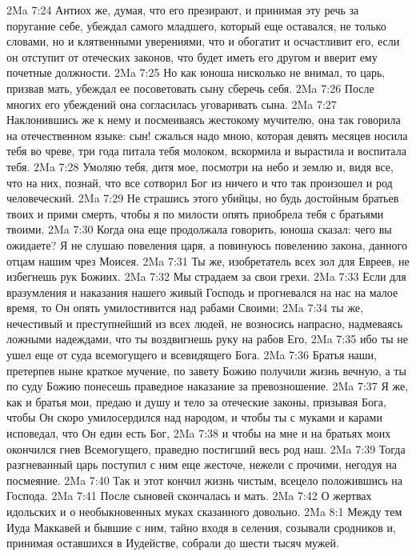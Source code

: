 \vs 2Ma 7:24 Антиох же, думая, что его презирают, и принимая эту речь за поругание себе, убеждал самого младшего, который еще оставался, не только словами, но и клятвенными уверениями, что и обогатит и осчастливит его, если он отступит от отеческих законов, что будет иметь его другом и вверит ему почетные должности.
\vs 2Ma 7:25 Но как юноша нисколько не внимал, то царь, призвав мать, убеждал ее посоветовать сыну сберечь себя.
\vs 2Ma 7:26 После многих его убеждений она согласилась уговаривать сына.
\vs 2Ma 7:27 Наклонившись же к нему и посмеиваясь жестокому мучителю, она так говорила на отечественном языке: сын! сжалься надо мною, которая девять месяцев носила тебя во чреве, три года питала тебя молоком, вскормила и вырастила и воспитала тебя.
\vs 2Ma 7:28 Умоляю тебя, дитя мое, посмотри на небо и землю и, видя все, что на них, познай, что все сотворил Бог из ничего и что так произошел и род человеческий.
\vs 2Ma 7:29 Не страшись этого убийцы, но будь достойным братьев твоих и прими смерть, чтобы я по милости  опять приобрела тебя с братьями твоими.
\rsbpar\vs 2Ma 7:30 Когда она еще продолжала говорить, юноша сказал: чего вы ожидаете? Я не слушаю повеления царя, а повинуюсь повелению закона, данного отцам нашим чрез Моисея.
\vs 2Ma 7:31 Ты же, изобретатель всех зол для Евреев, не избегнешь рук Божиих.
\vs 2Ma 7:32 Мы страдаем за свои грехи.
\vs 2Ma 7:33 Если для вразумления и наказания нашего живый Господь и прогневался на нас на малое время, то Он опять умилостивится над рабами Своими;
\vs 2Ma 7:34 ты же, нечестивый и преступнейший из всех людей, не возносись напрасно, надмеваясь ложными надеждами, что ты воздвигнешь руку на рабов Его,
\vs 2Ma 7:35 ибо ты не ушел еще от суда всемогущего и всевидящего Бога.
\vs 2Ma 7:36 Братья наши, претерпев ныне краткое мучение, по завету Божию получили жизнь вечную, а ты по суду Божию понесешь праведное наказание за превозношение.
\vs 2Ma 7:37 Я же, как и братья мои, предаю и душу и тело за отеческие законы, призывая Бога, чтобы Он скоро умилосердился над народом, и чтобы ты с муками и карами исповедал, что Он един есть Бог,
\vs 2Ma 7:38 и чтобы на мне и на братьях моих окончился гнев Всемогущего, праведно постигший весь род наш.
\vs 2Ma 7:39 Тогда разгневанный царь поступил с ним еще жесточе, нежели с прочими, негодуя на посмеяние.
\vs 2Ma 7:40 Так и этот кончил жизнь чистым, всецело положившись на Господа.
\vs 2Ma 7:41 После сыновей скончалась и мать.
\rsbpar\vs 2Ma 7:42 О жертвах идольских и о необыкновенных муках сказанного довольно.
\vs 2Ma 8:1 Между тем Иуда Маккавей и бывшие с ним, тайно входя в селения, созывали сродников и, принимая оставшихся в Иудействе, собрали до шести тысяч мужей.
